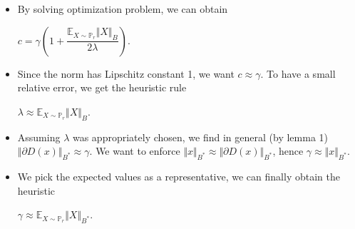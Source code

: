 \documentclass[landscape,headrule,footrule]{foils}
\begin{document}
\begin{frame}
\begin{flushleft}
\begin{itemize}
\item By solving optimization problem, we can obtain \\
\begin{center}
$c = \gamma \left(1+\dfrac{\mathbb{E}_{X \sim \mathbb{P}_r} \Vert X \Vert_B}{2 \lambda} \right)$. \\
\end{center}
\item Since the norm has Lipschitz constant 1, we want $c\approx \gamma$. To have a small relative error, we get the heuristic rule
\begin{center}
$ \lambda \approx \mathbb{E}_{X \sim \mathbb{P}_r} \Vert X \Vert_B$. \\
\end{center}
\item 
Assuming $\lambda$ was appropriately chosen, we find in general (by lemma 1) $\Vert \partial D(x) \Vert_{B^*} \approx \gamma$. We want to enforce $\Vert x \Vert_{B^*} \approx \Vert \partial D(x) \Vert_{B^*}$, hence $\gamma \approx \Vert x \Vert_{B^*}$. \\
\item We pick the expected values as a representative, we can finally obtain the heuristic
\begin{center}
$\gamma \approx \mathbb{E}_{X \sim \mathbb{P}_r} \Vert X \Vert_{B^*}$.
\end{center}

\end{itemize}
\end{flushleft}
\end{frame}

\end{document}
